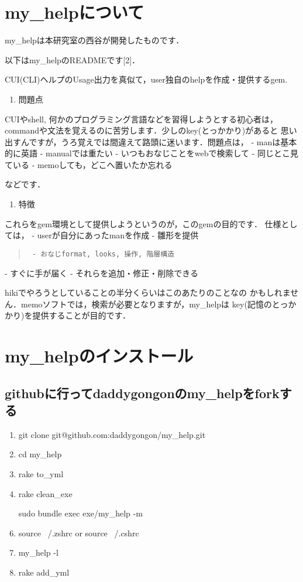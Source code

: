\section{my\_helpについて}
my\_helpは本研究室の西谷が開発したものです．

以下はmy\_helpのREADMEです[2]．

CUI(CLI)ヘルプのUsage出力を真似て，user独自のhelpを作成・提供するgem.

\begin{enumerate}
\item 問題点
\end{enumerate}
CUIやshell, 何かのプログラミング言語などを習得しようとする初心者は，
commandや文法を覚えるのに苦労します．少しのkey(とっかかり)があると
思い出すんですが，うろ覚えでは間違えて路頭に迷います．問題点は，
- manは基本的に英語
- manualでは重たい
- いつもおなじことをwebで検索して
- 同じとこ見ている
- memoしても，どこへ置いたか忘れる

などです．

\begin{enumerate}
\item 特徴
\end{enumerate}
これらをgem環境として提供しようというのが，このgemの目的です．
仕様としては，
- userが自分にあったmanを作成
- 雛形を提供
\begin{quote}\begin{verbatim}
 - おなじformat, looks, 操作, 階層構造
\end{verbatim}\end{quote}
- すぐに手が届く
- それらを追加・修正・削除できる

hikiでやろうとしていることの半分くらいはこのあたりのことなの
かもしれません．memoソフトでは，検索が必要となりますが，my\_helpは
key(記憶のとっかかり)を提供することが目的です．

\section{my\_helpのインストール}
\subsection{githubに行ってdaddygongonのmy\_helpをforkする}
\begin{enumerate}
\item git clone git@github.com:daddygongon/my\_help.git
\item cd my\_help
\item rake to\_yml
\item rake clean\_exe
\item [sudo] bundle exec exe/my\_help -m
\item source ~/.zshrc or source ~/.cshrc
\item my\_help -l
\item rake add\_yml
\end{enumerate}
